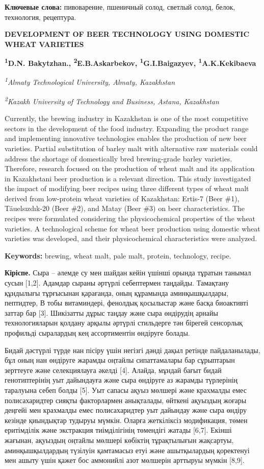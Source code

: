 {\bfseries Ключевые слова:} пивоварение, пшеничный солод, светлый солод,
белок, технология, рецептура.

{\bfseries DEVELOPMENT OF BEER TECHNOLOGY USING DOMESTIC WHEAT VARIETIES}

\hl{}

{\bfseries \textsuperscript{1}D.N. Bakytzhan.,
\textsuperscript{2}E.B.Askarbekov, \textsuperscript{1}G.I.Baigazyev,
\textsuperscript{1}A.K.Kekibaeva}

\emph{\textsuperscript{1}Almaty Technological University, Almaty,
Kazakhstan}

\emph{\textsuperscript{2}Kazakh University of Technology and Business,
Astana, Kazakhstan}

Currently, the brewing industry in Kazakhstan is one of the most
competitive sectors in the development of the food industry. Expanding
the product range and implementing innovative technologies enables the
production of new beer varieties. Partial substitution of barley malt
with alternative raw materials could address the shortage of
domestically bred brewing-grade barley varieties. Therefore, research
focused on the production of wheat malt and its application in
Kazakhstani beer production is a relevant direction. This study
investigated the impact of modifying beer recipes using three different
types of wheat malt derived from low-protein wheat varieties of
Kazakhstan: Ertis-7 (Beer \#1), Täuelsızdık-20 (Beer \#2), and Matay
(Beer \#3) on beer characteristics. The recipes were formulated
considering the physicochemical properties of the wheat varieties. A
technological scheme for wheat beer production using domestic wheat
varieties was developed, and their physicochemical characteristics were
analyzed.

{\bfseries Keywords:} brewing, wheat malt, pale malt, protein, technology,
recipe.

{\bfseries Кіріспе.} Сыра -- әлемде су мен шайдан кейін үшінші орында
тұратын танымал сусын {[}1,2{]}. Адамдар сыраны әртүрлі себептермен
таңдайды. Тамақтану құндылығы тұрғысынан қарағанда, оның құрамында
аминқышқылдары, пептидтер, В тобы витаминдері, фенолдық қосылыстар және
басқа биоактивті заттар бар {[}3{]}. Шикізатты дұрыс таңдау және сыра
өндірудің арнайы технологияларын қолдану арқылы әртүрлі стильдерге тән
бірегей сенсорлық профильді сыралардың кең ассортиментін өндіруге
болады.

Бидай дәстүрлі түрде нан пісіру үшін негізгі дәнді дақыл ретінде
пайдаланылады, бұл оның нан өндіруге жарамды оңтайлы сипаттамалары бар
сұрыптарын зерттеуге және селекциялауға әкелді {[}4{]}. Алайда, мұндай
бағыт бидай генотиптерінің уыт дайындауға және сыра өндіруге аз жарамды
түрлерінің таралуына себеп болды {[}5{]}. Уыт сапасы ақуыз мөлшері және
крахмалды емес полисахаридтер сияқты факторлармен анықталады, өйткені
ақуыздың жоғары деңгейі мен крахмалды емес полисахаридтер уыт дайындау
және сыра өндіру кезінде қиындықтар тудыруы мүмкін. Оларға жеткіліксіз
модификация, төмен еритімділік және экстракция тиімділігінің төмендігі
жатады {[}6,7{]}. Екінші жағынан, ақуыздың оңтайлы мөлшері көбіктің
тұрақтылығын жақсартуы, аминқышқылдардың түзілуін қамтамасыз етуі және
ашытқылардың қоректенуі мен ашыту үшін қажет бос аммонийлі азот мөлшерін
арттыруы мүмкін {[}8,9{]}.


